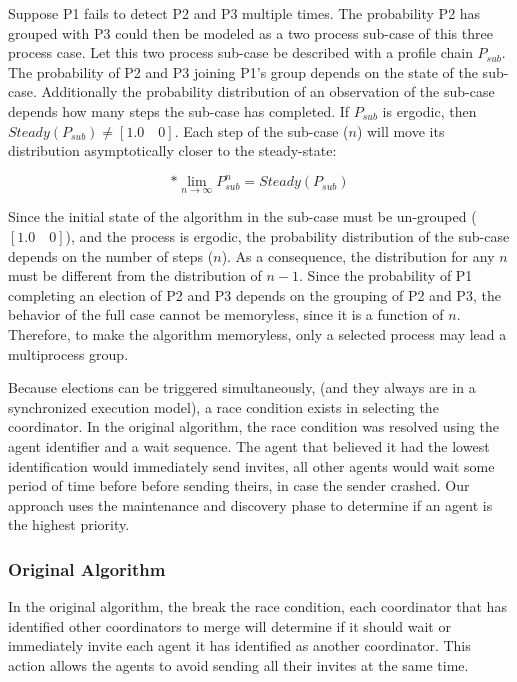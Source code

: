 Suppose P1 fails to detect P2 and P3 multiple times.
The probability P2 has grouped with P3 could then be modeled as a two process sub-case of this three process case.
Let this two process sub-case be described with a profile chain $P_{sub}$.
The probability of P2 and P3 joining P1's group depends on the state of the sub-case.
Additionally the probability distribution of an observation of the sub-case depends how many steps the sub-case has completed.
If $P_{sub}$ is ergodic, then $Steady(P_{sub}{}) \neq [1.0 \quad 0]$.
Each step of the sub-case ($n$) will move its distribution asymptotically closer to the steady-state:

\begin{equation} [1.0 \quad 0] * \lim_{n \to \infty}P_{sub}^n = Steady(P_{sub}) \end{equation}

Since the initial state of the algorithm in the sub-case must be un-grouped ($[1.0 \quad 0]$), and the process is ergodic, the probability distribution of the sub-case depends on the number of steps ($n$).
As a consequence, the distribution for any $n$ must be different from the distribution of $n-1$.
Since the probability of P1 completing an election of P2 and P3 depends on the grouping of P2 and P3, the behavior of the full case cannot be memoryless, since it is a function of $n$.
Therefore, to make the algorithm memoryless, only a selected process may lead a multiprocess group.

Because elections can be triggered simultaneously, (and they always are in a synchronized execution model), a race condition exists in selecting the coordinator. In the original algorithm, the race condition was resolved using the agent identifier and a wait sequence. The agent that believed it had the lowest identification would immediately send invites, all other agents would wait some period of time before before sending theirs, in case the sender crashed. Our approach uses the maintenance and discovery phase to determine if an agent is the highest priority.

\subsubsection{Original Algorithm}

In the original algorithm, the break the race condition, each coordinator that has identified other coordinators to merge will determine if it should wait or immediately invite each agent it has identified as another coordinator. This action allows the agents to avoid sending all their invites at the same time.

